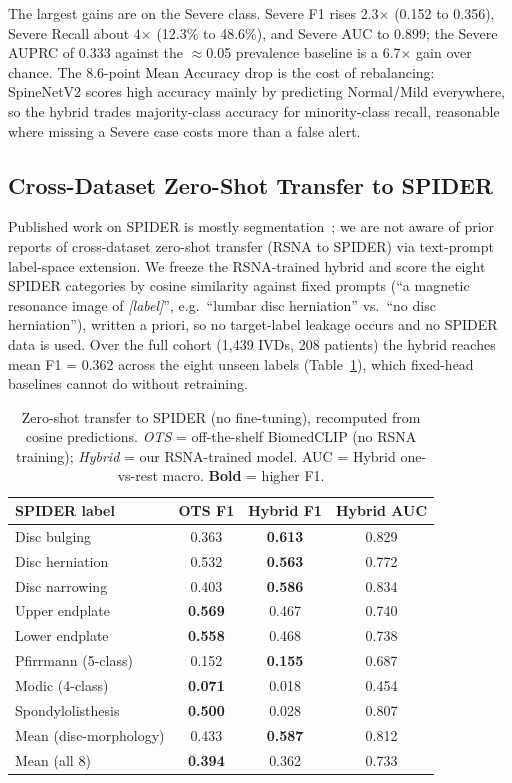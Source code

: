 \documentclass[runningheads]{llncs}
\newcommand{\best}[1]{\textcolor{best}{\textbf{#1}}}
\begin{document}
The largest gains are on the Severe class. Severe F1 rises 2.3$\times$ (0.152 to 0.356), Severe Recall about 4$\times$ (12.3\% to 48.6\%), and Severe AUC to 0.899; the Severe AUPRC of 0.333 against the $\approx$0.05 prevalence baseline is a 6.7$\times$ gain over chance. The 8.6-point Mean Accuracy drop is the cost of rebalancing: SpineNetV2 scores high accuracy mainly by predicting Normal/Mild everywhere, so the hybrid trades majority-class accuracy for minority-class recall, reasonable where missing a Severe case costs more than a false alert.

\subsection{Cross-Dataset Zero-Shot Transfer to SPIDER}

Published work on SPIDER is mostly segmentation~\cite{vandergraaf2024spider}; we are not aware of prior reports of cross-dataset zero-shot transfer (RSNA to SPIDER) via text-prompt label-space extension. We freeze the RSNA-trained hybrid and score the eight SPIDER categories by cosine similarity against fixed prompts (``a magnetic resonance image of \emph{[label]}'', e.g.\ ``lumbar disc herniation'' vs.\ ``no disc herniation''), written a priori, so no target-label leakage occurs and no SPIDER data is used. Over the full cohort (1{,}439 IVDs, 208 patients) the hybrid reaches mean F1 = 0.362 across the eight unseen labels (Table~\ref{tab:spider}), which fixed-head baselines cannot do without retraining.

\begin{table}[ht]
\centering
\caption{Zero-shot transfer to SPIDER (no fine-tuning), recomputed from cosine predictions. \emph{OTS} = off-the-shelf BiomedCLIP (no RSNA training); \emph{Hybrid} = our RSNA-trained model. AUC = Hybrid one-vs-rest macro. \textbf{Bold} = higher F1.}
\label{tab:spider}
\begin{tabular}{@{}lccc@{}}
\toprule
SPIDER label              & OTS F1 & Hybrid F1 & Hybrid AUC \\
\midrule
Disc bulging              & 0.363 & \best{0.613} & 0.829 \\
Disc herniation           & 0.532 & \best{0.563} & 0.772 \\
Disc narrowing            & 0.403 & \best{0.586} & 0.834 \\
\midrule
Upper endplate            & \best{0.569} & 0.467 & 0.740 \\
Lower endplate            & \best{0.558} & 0.468 & 0.738 \\
Pfirrmann (5-class)       & 0.152 & \best{0.155} & 0.687 \\
Modic (4-class)           & \best{0.071} & 0.018 & 0.454 \\
Spondylolisthesis         & \best{0.500} & 0.028 & 0.807 \\
\midrule
Mean (disc-morphology)    & 0.433 & \best{0.587} & 0.812 \\
Mean (all 8)              & \best{0.394} & 0.362 & 0.733 \\
\bottomrule
\end{tabular}
\end{table}
\end{document}
